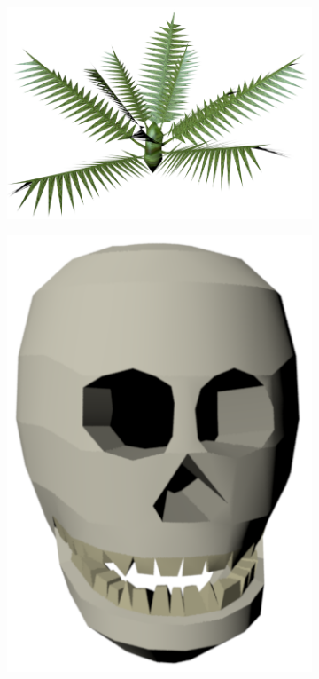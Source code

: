 \begin{figure}[h!]
    \centering
    \begin{subfigure}[b]{0.3\textwidth}
        \includegraphics[scale=0.2]{figures/fern.png}\caption{ \label{fig:fern}}
    \end{subfigure}
    \begin{subfigure}[b]{0.3\textwidth}
        \includegraphics[scale=0.2]{figures/skull.png}\caption{ \label{fig:skull}}
    \end{subfigure}
    \begin{subfigure}[b]{0.3\textwidth}

\end{subfigure}
\end{figure}
